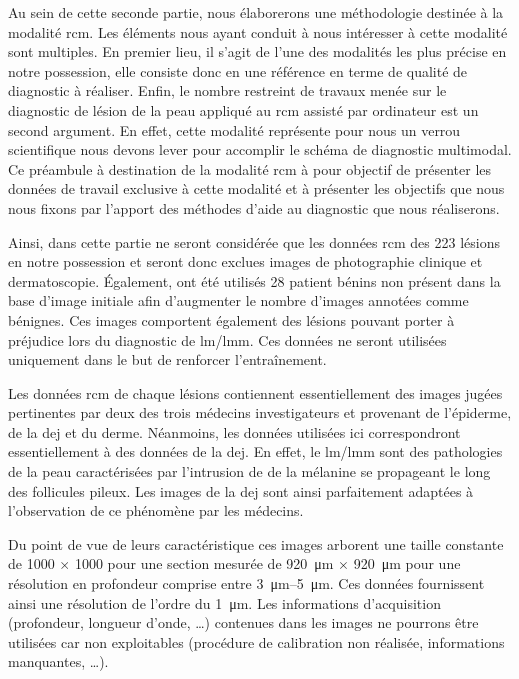 \renewcommand{\thechapter}{\roman{chapter}}
\setcounter{chapter}{3}
\setcounter{figure}{0}

\label{chap:preamble_microscopy}
Au sein de cette seconde partie, nous élaborerons une méthodologie destinée à la modalité \gls{rcm}. Les éléments nous ayant conduit à nous intéresser à cette modalité sont multiples. En premier lieu, il s'agit de l'une des modalités les plus précise en notre possession, elle consiste donc en une référence en terme de qualité de diagnostic à réaliser. Enfin, le nombre restreint de travaux menée sur le diagnostic de lésion de la peau appliqué au \gls{rcm} assisté par ordinateur est un second argument. En effet, cette modalité représente pour nous un verrou scientifique nous devons lever pour accomplir le schéma de diagnostic multimodal. Ce préambule à destination de la modalité \gls{rcm} à pour objectif de présenter les données de travail exclusive à cette modalité et à présenter les objectifs que nous nous fixons par l'apport des méthodes d'aide au diagnostic que nous réaliserons.\par

Ainsi, dans cette partie ne seront considérée que les données \gls{rcm} des 223 lésions en notre possession et seront donc exclues images de photographie clinique et dermatoscopie. Également, ont été utilisés 28 patient bénins non présent dans la base d'image initiale afin d'augmenter le nombre d'images annotées comme bénignes. Ces images comportent également des lésions pouvant porter à préjudice lors du diagnostic de \gls{lm}/\gls{lmm}. Ces données ne seront utilisées uniquement dans le but de renforcer l'entraînement.\par

Les données \gls{rcm} de chaque lésions contiennent essentiellement des images jugées pertinentes par deux des trois médecins investigateurs et provenant de l'épiderme, de la \gls{dej} et du derme. Néanmoins, les données utilisées ici correspondront essentiellement à des données de la \gls{dej}. En effet, le \gls{lm}/\gls{lmm} sont des pathologies de la peau caractérisées par l'intrusion de de la mélanine se propageant le long des follicules pileux. Les images de la \gls{dej} sont ainsi parfaitement adaptées à l'observation de ce phénomène par les médecins.\par

Du point de vue de leurs caractéristique ces images arborent une taille constante de \SI{1000}{\px} $\times$ \SI{1000}{\px} pour une section mesurée de \SI{920}{\micro\metre} $\times$ \SI{920}{\micro\metre} pour une résolution en profondeur comprise entre \SIrange{3}{5}{\micro\metre}. Ces données fournissent ainsi une résolution de l'ordre du \SI{1}{\micro\metre}. Les informations d'acquisition (profondeur, longueur d'onde, \ldots) contenues dans les images ne pourrons être utilisées car non exploitables (procédure de calibration non réalisée, informations manquantes, \ldots).\par


